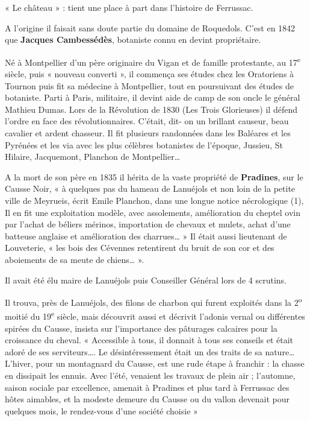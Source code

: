 
« Le château » : tient une place à part dans l’histoire de Ferrussac.

A l’origine il faisait sans doute partie du domaine de Roquedols. C’est en 1842 que
\textbf{Jacques Cambessédès}, botaniste connu en devint propriétaire.

Né à Montpellier d’un père originaire du Vigan et de famille protestante, au 17\textsuperscript{e} siècle, puis « nouveau
converti », il commença ses études chez les Oratoriens à Tournon puis fit sa médecine à Montpellier,
tout en poursuivant des études de botaniste.
Parti à Paris, militaire, il devint aide de camp de son oncle le général Mathieu Dumas. Lors de la
Révolution de 1830 (Les Trois Glorieuses) il défend l’ordre en face des révolutionnaires. C’était, dit-
on un brillant causeur, beau cavalier et ardent chasseur.
Il fit plusieurs randonnées dans les Baléares et les Pyrénées et les via avec les plus célèbres botanistes
de l’époque, Jussieu, St Hilaire, Jacquemont, Planchon de Montpellier…

A la mort de son père en 1835 il hérita de la vaste propriété de \textbf{Pradines}, sur le Causse Noir, « à
quelques pas du hameau de Lanuéjols et non loin de la petite ville de Meyrueis, écrit Emile Planchon,
dans une longue notice nécrologique (1), Il en fit une exploitation modèle, avec assolements,
amélioration du cheptel ovin par l’achat de béliers mérinos, importation de chevaux et mulets, achat
d’une batteuse anglaise et amélioration des charrues… »
Il était aussi lieutenant de Louveterie, « les bois des Cévennes retentirent du bruit de son cor et des
aboiements de sa meute de chiens… ».

Il avait été élu maire de Lanuéjols puis Conseiller Général lors de 4 scrutins.

Il trouva, près de Lanuéjols, des filons de charbon qui furent exploités dans la 2\textsuperscript{o} moitié du 19\textsuperscript{e} siècle,
mais découvrit aussi et décrivit l’adonis vernal ou différentes spirées du Causse, insista sur
l’importance des pâturages calcaires pour la croissance du cheval.
« Accessible à tous, il donnait à tous ses conseils et était adoré de ses serviteurs…. Le
désintéressement était un des traits de sa nature… L’hiver, pour un montagnard du Causse, est une
rude étape à franchir : la chasse en dissipait les ennuis. Avec l’été, venaient les travaux de plein air ;
l’automne, saison sociale par excellence, amenait à Pradines et plus tard à Ferrussac des hôtes
aimables, et la modeste demeure du Causse ou du vallon devenait pour quelques mois, le rendez-vous
d’une société choisie »


